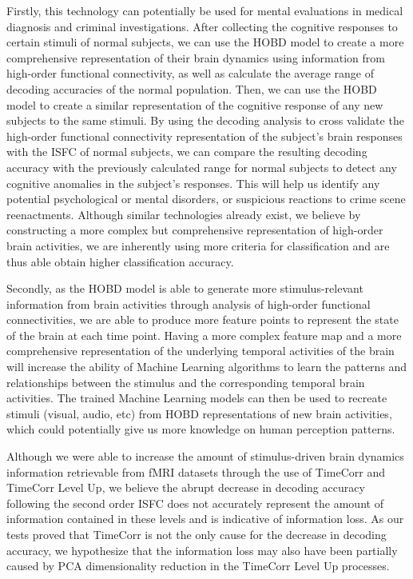 \documentclass[11pt]{article}
\begin{document}
\begin{enumerate}
Firstly, this technology can potentially be used for mental evaluations in medical diagnosis and criminal investigations. After collecting the cognitive responses to certain stimuli of normal subjects, we can use the HOBD model to create a more comprehensive representation of their brain dynamics using information from high-order functional connectivity, as well as calculate the average range of decoding accuracies of the normal population. Then, we can use the HOBD model to create a similar representation of the cognitive response of any new subjects to the same stimuli. By using the decoding analysis to cross validate the high-order functional connectivity representation of the subject's brain responses with the ISFC of normal subjects, we can compare the resulting decoding accuracy with the previously calculated range for normal subjects to detect any cognitive anomalies in the subject's responses. This will help us identify any potential psychological or mental disorders, or suspicious reactions to crime scene reenactments. Although similar technologies already exist, we believe by constructing a more complex but comprehensive representation of high-order brain activities, we are inherently using more criteria for classification and are thus able obtain higher classification accuracy.

Secondly, as the HOBD model is able to generate more stimulus-relevant information from brain activities through analysis of high-order functional connectivities, we are able to produce more feature points to represent the state of the brain at each time point. Having a more complex feature map and a more comprehensive representation of the underlying temporal activities of the brain will increase the ability of Machine Learning algorithms to learn the patterns and relationships between the stimulus and the corresponding temporal brain activities. The trained Machine Learning models can then be used to recreate stimuli (visual, audio, etc) from HOBD representations of new brain activities, which could potentially give us more knowledge on human perception patterns.

Although we were able to increase the amount of stimulus-driven brain dynamics information retrievable from fMRI datasets through the use of TimeCorr and TimeCorr Level Up, we believe the abrupt decrease in decoding accuracy following the second order ISFC does not accurately represent the amount of information contained in these levels and is indicative of information loss. As our tests proved that TimeCorr is not the only cause for the decrease in decoding accuracy, we hypothesize that the information loss may also have been partially caused by PCA dimensionality reduction in the TimeCorr Level Up processes.


\end{enumerate}
\end{document}
